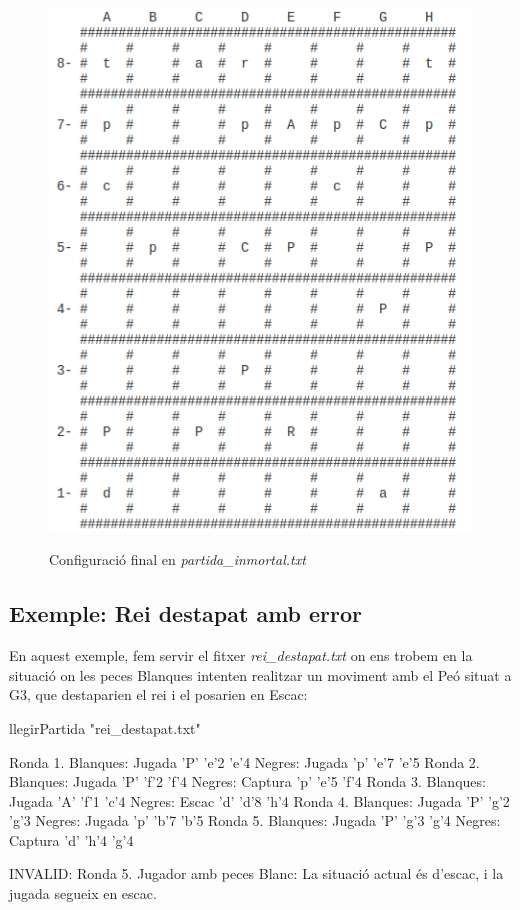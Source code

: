\documentclass{article}
\begin{document}
\begin{figure}[ht]
\centering
\includegraphics[scale=0.45]{partida_inmortal.png}
\begin{center}Configuració final en \textit{partida\_inmortal.txt}\end{center}
\end{figure}
\noindent
\newpage
\subsection{Exemple: Rei destapat \textbf{amb error}}
En aquest exemple, fem servir el fitxer \textit{rei\_destapat.txt} on ens trobem en la situació on les peces Blanques intenten realitzar un moviment amb el Peó situat a G3, que destaparien el rei i el posarien en Escac:
\begin{tcolorbox}
llegirPartida "rei\_destapat.txt"
\end{tcolorbox}
\begin{tcolorbox}
Ronda 1.
Blanques: Jugada 'P' 'e'2 'e'4
Negres:   Jugada 'p' 'e'7 'e'5
Ronda 2.
Blanques: Jugada 'P' 'f'2 'f'4
Negres:   Captura 'p' 'e'5 'f'4
Ronda 3.
Blanques: Jugada 'A' 'f'1 'c'4
Negres:   Escac 'd' 'd'8 'h'4
 Ronda 4.
Blanques: Jugada 'P' 'g'2 'g'3
Negres:   Jugada 'p' 'b'7 'b'5
Ronda 5.
Blanques: Jugada 'P' 'g'3 'g'4
Negres:   Captura 'd' 'h'4 'g'4

INVALID: Ronda 5. Jugador amb peces Blanc: La situació actual és d'escac, i la jugada segueix en escac.
\end{tcolorbox}
\end{document}
